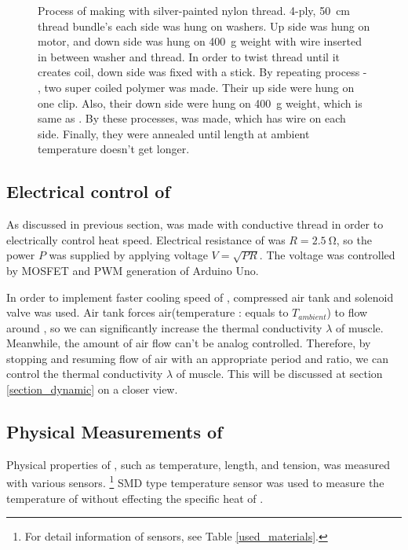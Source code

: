 \begin{figure}
	\caption[Process of making \scp with silver-painted nylon thread]{Process of making \scp with silver-painted nylon thread.  4-ply, \SI{50}{\centi\meter} thread bundle's each side was hung on washers.  Up side was hung on motor, and down side was hung on \SI{400}{\gram} weight with wire inserted in between washer and thread.  In order to twist thread until it creates coil, down side was fixed with a stick.  By repeating process  - , two super coiled polymer was made. Their up side were hung on one clip. Also, their down side were hung on \SI{400}{\gram} weight, which is same as .  By these processes, \scp was made, which has wire on each side.  Finally, they were annealed until length at ambient temperature doesn't get longer.}
	\label{silverSCP_makingof}
\end{figure}

\subsection{Electrical control of \scp}\label{section_electrical_control}
As discussed in previous section, \scp was made with conductive thread in order to electrically control heat speed. Electrical resistance of \scp was $R=\SI{2.5}{\ohm}$, so the power $P$ was supplied by applying voltage $V=\sqrt{PR}$. The voltage was controlled by MOSFET and PWM generation of Arduino Uno.

In order to implement faster cooling speed of \scp, compressed air tank and solenoid valve was used. Air tank forces air(temperature : equals to  $T_{ambient}$) to flow around \scp, so we can significantly increase the thermal conductivity $\lambda$ of muscle. Meanwhile, the amount of air flow can't be analog controlled. Therefore, by stopping and resuming flow of air with an appropriate period and ratio, we can control the thermal conductivity $\lambda$ of muscle. This will be discussed at section \ref{section_dynamic} on a closer view.

\subsection{Physical Measurements of \scp}
Physical properties of \scp, such as temperature, length, and tension, was measured with various sensors.
\footnote{For detail information of sensors, see Table \ref{used_materials}.}
SMD type temperature sensor was used to measure the temperature of \scp without effecting the specific heat of \scpnospace.

